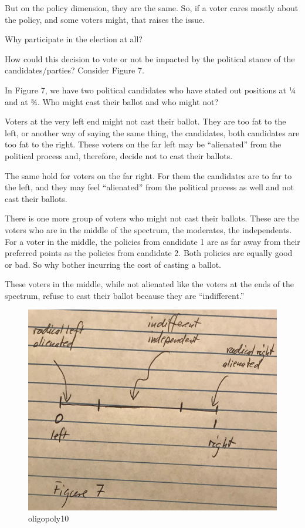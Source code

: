 \documentclass[
]{book}
\begin{document}
But on the policy dimension, they are the same. So, if a voter cares mostly about the policy, and some voters might, that raises the issue.

Why participate in the election at all?

How could this decision to vote or not be impacted by the political stance of the candidates/parties?
Consider Figure 7.

In Figure 7, we have two political candidates who have stated out positions at ¼ and at ¾. Who might cast their ballot and who might not?

Voters at the very left end might not cast their ballot. They are too fat to the left, or another way of saying the same thing, the candidates, both candidates are too fat to the right. These voters on the far left may be ``alienated'' from the political process and, therefore, decide not to cast their ballots.

The same hold for voters on the far right. For them the candidates are to far to the left, and they may feel ``alienated'' from the political process as well and not cast their ballots.

There is one more group of voters who might not cast their ballots. These are the voters who are in the middle of the spectrum, the moderates, the independents. For a voter in the middle, the policies from candidate 1 are as far away from their preferred points as the policies from candidate 2. Both policies are equally good or bad. So why bother incurring the cost of casting a ballot.

These voters in the middle, while not alienated like the voters at the ends of the spectrum, refuse to cast their ballot because they are ``indifferent.''

\begin{figure}

{\centering \includegraphics[width=0.5\linewidth]{img/oligopoly/fig10} 

}

\caption{oligopoly10}\label{fig:oligopoly10}
\end{figure}
\end{document}
